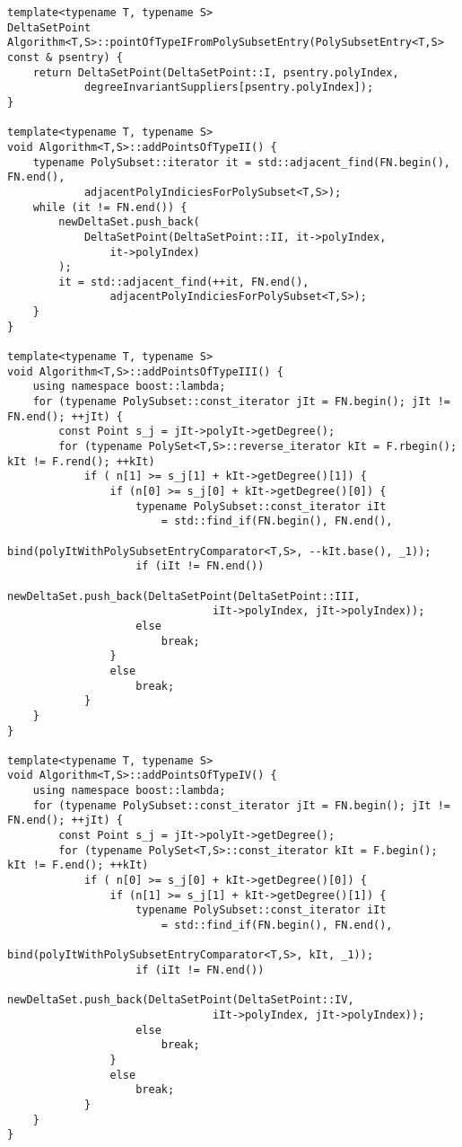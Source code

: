 \begin{lstlisting}
template<typename T, typename S>
DeltaSetPoint
Algorithm<T,S>::pointOfTypeIFromPolySubsetEntry(PolySubsetEntry<T,S> const & psentry) {
    return DeltaSetPoint(DeltaSetPoint::I, psentry.polyIndex,
            degreeInvariantSuppliers[psentry.polyIndex]);
}

template<typename T, typename S>
void Algorithm<T,S>::addPointsOfTypeII() {
    typename PolySubset::iterator it = std::adjacent_find(FN.begin(), FN.end(),
            adjacentPolyIndiciesForPolySubset<T,S>);
    while (it != FN.end()) {
        newDeltaSet.push_back(
            DeltaSetPoint(DeltaSetPoint::II, it->polyIndex,
                it->polyIndex)
        );
        it = std::adjacent_find(++it, FN.end(),
                adjacentPolyIndiciesForPolySubset<T,S>);
    }
}

template<typename T, typename S>
void Algorithm<T,S>::addPointsOfTypeIII() {
    using namespace boost::lambda;
    for (typename PolySubset::const_iterator jIt = FN.begin(); jIt != FN.end(); ++jIt) {
        const Point s_j = jIt->polyIt->getDegree();
        for (typename PolySet<T,S>::reverse_iterator kIt = F.rbegin(); kIt != F.rend(); ++kIt)
            if ( n[1] >= s_j[1] + kIt->getDegree()[1]) {
                if (n[0] >= s_j[0] + kIt->getDegree()[0]) {
                    typename PolySubset::const_iterator iIt
                        = std::find_if(FN.begin(), FN.end(),
                            bind(polyItWithPolySubsetEntryComparator<T,S>, --kIt.base(), _1));
                    if (iIt != FN.end())
                        newDeltaSet.push_back(DeltaSetPoint(DeltaSetPoint::III,
                                iIt->polyIndex, jIt->polyIndex));
                    else
                        break;
                }
                else
                    break;
            }
    }
}

template<typename T, typename S>
void Algorithm<T,S>::addPointsOfTypeIV() {
    using namespace boost::lambda;
    for (typename PolySubset::const_iterator jIt = FN.begin(); jIt != FN.end(); ++jIt) {
        const Point s_j = jIt->polyIt->getDegree();
        for (typename PolySet<T,S>::const_iterator kIt = F.begin(); kIt != F.end(); ++kIt)
            if ( n[0] >= s_j[0] + kIt->getDegree()[0]) {
                if (n[1] >= s_j[1] + kIt->getDegree()[1]) {
                    typename PolySubset::const_iterator iIt
                        = std::find_if(FN.begin(), FN.end(),
                            bind(polyItWithPolySubsetEntryComparator<T,S>, kIt, _1));
                    if (iIt != FN.end())
                        newDeltaSet.push_back(DeltaSetPoint(DeltaSetPoint::IV,
                                iIt->polyIndex, jIt->polyIndex));
                    else
                        break;
                }
                else
                    break;
            }
    }
}


\end{lstlisting}
